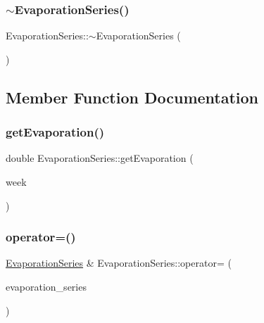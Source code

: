 \subsubsection{\texorpdfstring{$\sim$\+Evaporation\+Series()}{~EvaporationSeries()}}
{\footnotesize\ttfamily Evaporation\+Series\+::$\sim$\+Evaporation\+Series (\begin{DoxyParamCaption}{ }\end{DoxyParamCaption})\hspace{0.3cm}{\ttfamily [override]}}



\subsection{Member Function Documentation}
\mbox{\label{classEvaporationSeries_a4d793fbcb73e8fb6c179968130d6fd0a}} 
\subsubsection{\texorpdfstring{get\+Evaporation()}{getEvaporation()}}
{\footnotesize\ttfamily double Evaporation\+Series\+::get\+Evaporation (\begin{DoxyParamCaption}\item[{int}]{week }\end{DoxyParamCaption})}

\mbox{\label{classEvaporationSeries_ad7eb758ce8774ce87732a86c23d24356}} 
\subsubsection{\texorpdfstring{operator=()}{operator=()}}
{\footnotesize\ttfamily \mbox{\hyperlink{classEvaporationSeries}{Evaporation\+Series}} \& Evaporation\+Series\+::operator= (\begin{DoxyParamCaption}\item[{const \mbox{\hyperlink{classEvaporationSeries}{Evaporation\+Series}} \&}]{evaporation\+\_\+series }\end{DoxyParamCaption})}

